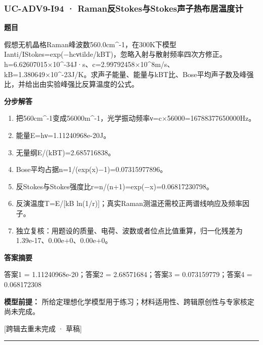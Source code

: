 \documentclass[UTF8,11pt,a4paper]{ctexart}
\begin{document}
\subsubsection*{UC-ADV9-I94 · Raman反Stokes与Stokes声子热布居温度计}
\noindent\textbf{题目}\par
假想无机晶格Raman峰波数560.0cm\textasciicircum{}-1，在300K下模型Ianti/IStokes=exp(−hcνtilde/kBT)，忽略入射与散射频率四次方修正。h=6.62607015×10\textasciicircum{}-34J·s、c=2.99792458×10\textasciicircum{}8m/s、kB=1.380649×10\textasciicircum{}-23J/K。求声子能量、能量与kBT比、Bose平均声子数及峰强比，并给出由实验峰强比反算温度的公式。\par
\medskip\noindent\textbf{分步解答}
\begin{enumerate}
\item 把560cm\textasciicircum{}-1变成56000m\textasciicircum{}-1，光学振动频率ν=c×56000=16788377650000Hz。
\item 能量E=hν=1.11240968e-20J。
\item 无量纲E/(kBT)=2.685716838。
\item Bose平均占据n=1/(exp(x)−1)=0.07315977896。
\item 反Stokes与Stokes强度比r=n/(n+1)=exp(−x)=0.06817230798。
\item 反演温度T=E/[kB ln(1/r)]；真实Raman测温还需校正两谱线响应及频率因子。
\item 独立复核：用题设的质量、电荷、波数或者位点比值重算，归一化残差为1.39e-17、0.00e+0、0.00e+0。
\end{enumerate}
\noindent\textbf{答案摘要}\par
答案1 = 1.11240968e-20；答案2 = 2.68571684；答案3 = 0.073159779；答案4 = 0.068172308\par
\noindent\textbf{模型前提：}
所给定理想化学模型用于练习；材料适用性、跨辑原创性与专家核定尚未完成。\par
\noindent\textcolor{red!65!black}{[跨辑去重未完成 · 草稿]} \par
\medskip\hrule\medskip
{}
\end{document}

